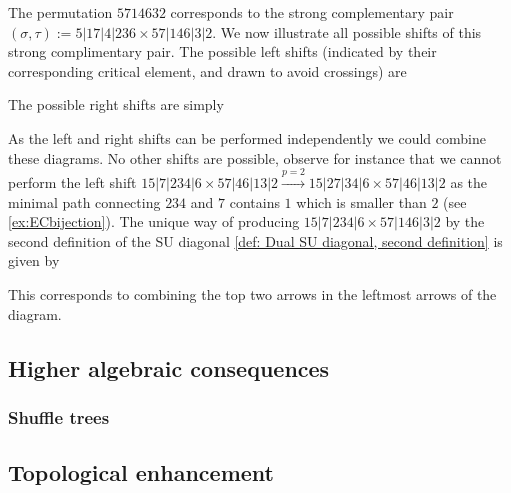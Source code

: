 \begin{example} \label{ex:shifts}
The permutation $5714632$ corresponds to the strong complementary pair $(\sigma,\tau) := 5|17|4|236 \times 57|146|3|2$. We now illustrate all possible shifts of this strong complimentary pair. The possible left shifts (indicated by their corresponding critical element, and drawn to avoid crossings) are
\begin{center}
\end{center}
The possible right shifts are simply
\begin{center}
\end{center}
As the left and right shifts can be performed independently we could combine these diagrams.
No other shifts are possible, observe for instance that we cannot perform the left shift $15|7|234|6 \times 57|46|13|2 \xrightarrow{p=2} 15|27|34|6 \times 57|46|13|2$ as the minimal path connecting $234$ and $7$ contains $1$ which is smaller than $2$ (see \cref{ex:ECbijection}). The unique way of producing $15|7|234|6 \times 57|146|3|2$ by the second definition of the SU diagonal \cref{def: Dual SU diagonal, second definition} is given by
\begin{center}
\end{center}
This corresponds to combining the top two arrows in the leftmost arrows of the diagram.
\end{example}



\subsection{Higher algebraic consequences}

\subsubsection{Shuffle trees}

\subsection{Topological enhancement}






